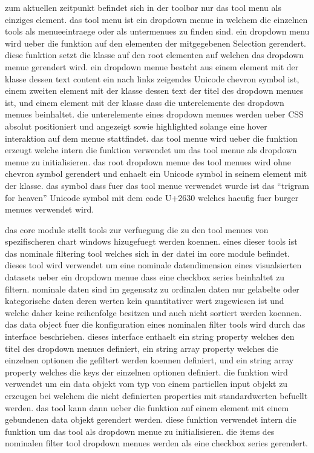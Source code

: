 zum aktuellen zeitpunkt befindet sich in der toolbar nur das tool menu als einziges element.
das tool menu ist ein dropdown menue in welchem die einzelnen tools als menueeintraege oder als untermenues zu finden sind.
ein dropdown menu wird ueber die  funktion auf den elementen der mitgegebenen Selection gerendert.
diese funktion setzt die  klasse auf den root elementen auf welchen das dropdown menue gerendert wird.
ein dropdown menue besteht aus einem  element mit der  klasse dessen text content ein nach links zeigendes Unicode chevron symbol ist, einem zweiten  element mit der  klasse dessen text der titel des dropdown menues ist, und einem  element mit der  klasse dass die unterelemente des dropdown menues beinhaltet.
die unterelemente eines dropdown menues werden ueber CSS absolut positioniert und angezeigt sowie highlighted solange eine hover interaktion auf dem menue stattfindet.
das tool menue wird ueber die  funktion erzeugt welche intern die  funktion verwendet um das tool menue als dropdown menue zu initialisieren.
das root dropdown menue des tool menues wird ohne chevron symbol gerendert und enhaelt ein Unicode symbol in seinem  element mit der  klasse. 
das symbol dass fuer das tool menue verwendet wurde ist das \enquote{trigram for heaven} Unicode symbol mit dem code U+2630 welches haeufig fuer burger menues verwendet wird.

das core module stellt tools zur verfuegung die zu den tool menues von spezifischeren chart windows hizugefuegt werden koennen.
eines dieser tools ist das nominale filtering tool welches sich in der  datei im core module befindet.
dieses tool wird verwendet um eine nominale datendimension eines visualsierten datasets ueber ein dropdown menue dass eine checkbox series beinhaltet zu filtern.
nominale daten sind im gegensatz zu ordinalen daten nur gelabelte oder kategorische daten deren werten kein quantitativer wert zugewiesen ist und welche daher keine reihenfolge besitzen und auch nicht sortiert werden koennen.
das data object fuer die konfiguration eines nominalen filter tools wird durch das  interface beschrieben.
dieses interface enthaelt ein  string property welches den titel des dropdown menues definiert, ein  string array property welches die einzelnen optionen die gefiltert werden koennen definiert, und ein  string array property welches die keys der einzelnen optionen definiert. 
die  funktion wird verwendet um ein data objekt vom typ  von einem partiellen input objekt zu erzeugen bei welchem die nicht definierten properties mit standardwerten befuellt werden.
das tool kann dann ueber die  funktion auf einem element mit einem gebundenen  data objekt gerendert werden.
diese funktion verwendet intern die  funktion um das tool als dropdown menue zu initialisieren.
die items des nominalen filter tool dropdown menues werden als eine checkbox series gerendert.

